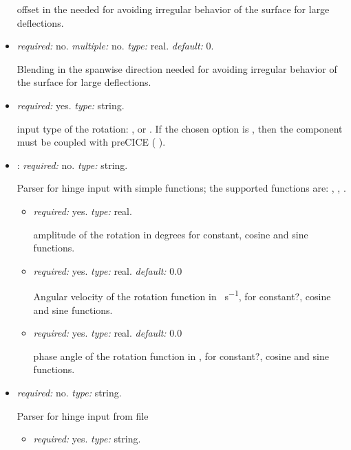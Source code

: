 \begin{itemize}
    offset in the  needed for avoiding irregular behavior of the surface for large deflections.

    \item {} \textit{required:} no. \textit{multiple:} no. \textit{type:} real. \textit{default:} 0.
    
    Blending in the spanwise direction needed for avoiding irregular behavior of the surface for large deflections.
    
    \item {}
    \textit{required:} yes. \textit{type:} string.
    
    input type of the rotation: ,  or . If the chosen option is , then the component must be coupled with preCICE ( ).
    
    \item {}: \textit{required:} no. \textit{type:} string. 
    
    Parser for hinge input with simple functions; the supported functions are: , , . 
    \begin{itemize}
        \item {} \textit{required:} yes. \textit{type:} real. 
        
        amplitude of the rotation in degrees for constant, cosine and sine functions. 
        
        \item {} \textit{required:} yes. \textit{type:} real. \textit{default:} 0.0 
        
        Angular velocity of the rotation function in \si{\deg\per\second}, for constant?, cosine and sine functions.
        
        \item {} \textit{required:} yes. \textit{type:} real. \textit{default:} 0.0
        
        phase angle of the rotation function in \si{\deg}, for constant?, cosine and sine functions.
    \end{itemize}
    \item {} \textit{required:} no. \textit{type:} string. 
    
    Parser for hinge input from file
    
    \begin{itemize}
        \item {} \textit{required:} yes. \textit{type:} string. 
        

\end{itemize}
\end{itemize}
